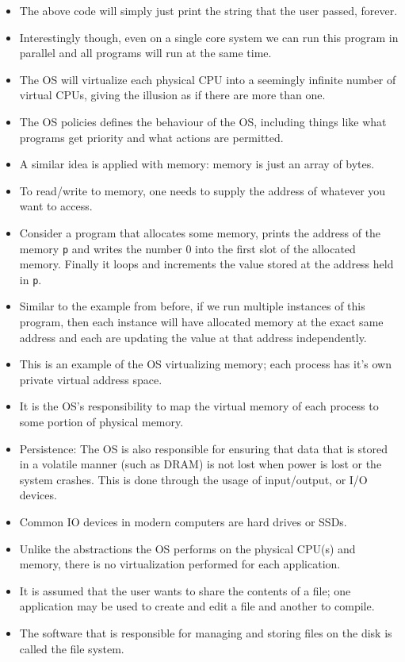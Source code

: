 \documentclass[11pt, a4paper]{article}
\theoremstyle{definition}
\theoremstyle{remark}
\begin{document}
\begin{itemize}
  \item The above code will simply just print the string that the user passed, forever. 
  \item Interestingly though, even on a single core system we can run this program in parallel and all programs will run at the same time.
  \item The OS will virtualize each physical CPU into a seemingly infinite number of virtual CPUs, giving the illusion as if there are more than one.
  \item The OS policies defines the behaviour of the OS, including things like what programs get priority and what actions are permitted. 
  \item A similar idea is applied with memory: memory is just an array of bytes. 
  \item To read/write to memory, one needs to supply the address of whatever you want to access. 
  \item Consider a program that allocates some memory, prints the address of the memory \texttt{p} and writes the number 0 into the first slot of the allocated memory. Finally it loops and increments the value stored at the address held in \texttt{p}. 
  \item Similar to the example from before, if we run multiple instances of this program, then each instance will have allocated memory at the exact same address and each are updating the value at that address independently. 
  \item This is an example of the OS virtualizing memory; each process has it's own private virtual address space. 
  \item It is the OS's responsibility to map the virtual memory of each process to some portion of physical memory.
  \item Persistence: The OS is also responsible for ensuring that data that is stored in a volatile manner (such as DRAM) is not lost when power is lost or the system crashes. This is done through the usage of input/output, or I/O devices.
  \item Common IO devices in modern computers are hard drives or SSDs.
  \item Unlike the abstractions the OS performs on the physical CPU(s) and memory, there is no virtualization performed for each application. 
  \item It is assumed that the user wants to share the contents of a file; one application may be used to create and edit a file and another to compile. 
  \item The software that is responsible for managing and storing files on the disk is called the file system.
\end{itemize}
\end{document}
